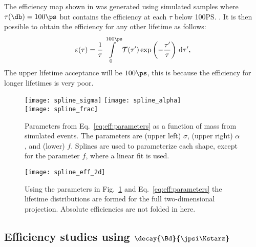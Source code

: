 The efficiency map shown in  was generated using simulated samples where
$\tau(\db)=100\ps$ but contains the efficiency at each $\tau$ below 100\ps.
It is then possible to obtain the efficiency for any other lifetime as follows:
\begin{equation}
  \varepsilon(\tau) =
  \frac{1}{\tau}\int\limits_0^{100\ps}
  \mathcal{T}(\tau^{\prime})
  \exp\left(-\frac{\tau^{\prime}}{\tau}\right)
  \,{\rm d}\tau^{\prime},
\end{equation}
The upper lifetime acceptance will be $100\ps$, this is because the efficiency for longer lifetimes
is very poor.


\begin{figure}
  \begin{center}
    \texttt{[image: spline\_sigma]}
    \texttt{[image: spline\_alpha]}\\
    \texttt{[image: spline\_frac]}
    \caption{
      Parameters from Eq.~\protect\ref{eq:eff:parameters} as a function of mass from
      simulated events.
      The parameters are
      (upper left) $\sigma$,
      (upper right) $\alpha$, and
      (lower) $f$.
      Splines are used to parameterize each shape, except for the parameter $f$, where a
      linear fit is used.
    }
    \label{fig:eff:spline}
  \end{center}
\end{figure}

\begin{figure}
  \begin{center}
    \texttt{[image: spline\_eff\_2d]}
    \caption{
      Using the parameters in Fig.~\ref{fig:eff:spline} and Eq.~\protect\ref{eq:eff:parameters} the
      lifetime distributions are formed for the full two-dimensional projection.
      Absolute efficiencies are not folded in here.
    }
    \label{fig:eff:effmap}
  \end{center}
\end{figure}



\subsection[Efficiency studies using \decay{\Bd}{\jpsi\Kstarz}]
{Efficiency studies using $\boldsymbol{\decay{\Bd}{\jpsi\Kstarz}}$}










